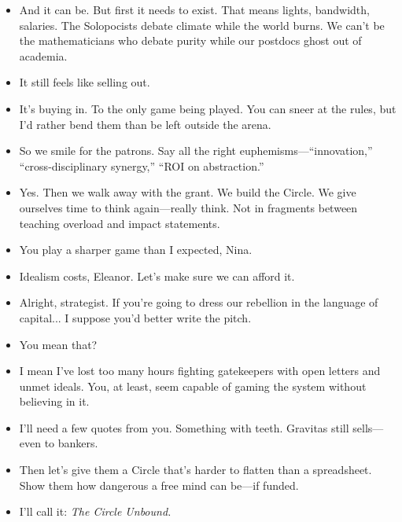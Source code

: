\begin{itemize}[leftmargin=1.3cm]
\item[Nina:] And it can be. But first it needs to exist. That means lights, bandwidth, salaries. The Solopocists debate climate while the world burns. We can’t be the mathematicians who debate purity while our postdocs ghost out of academia.

\item[Eleanor:] It still feels like selling out.

\item[Nina:] It’s buying in. To the only game being played. You can sneer at the rules, but I’d rather bend them than be left outside the arena.

\item[Eleanor:] So we smile for the patrons. Say all the right euphemisms—“innovation,” “cross-disciplinary synergy,” “ROI on abstraction.”

\item[Nina:] Yes. Then we walk away with the grant. We build the Circle. We give ourselves time to think again—really think. Not in fragments between teaching overload and impact statements.

\item[Eleanor:] You play a sharper game than I expected, Nina.

\item[Nina:] Idealism costs, Eleanor. Let's make sure we can afford it.

\item[Eleanor:] Alright, strategist. If you’re going to dress our rebellion in the language of capital... I suppose you’d better write the pitch.

\item[Nina:] You mean that?

\item[Eleanor:] I mean I’ve lost too many hours fighting gatekeepers with open letters and unmet ideals. You, at least, seem capable of gaming the system without believing in it.

\item[Nina:] I’ll need a few quotes from you. Something with teeth. Gravitas still sells—even to bankers.

\item[Eleanor:] Then let’s give them a Circle that’s harder to flatten than a spreadsheet. Show them how dangerous a free mind can be—if funded.

\item[Nina:] I’ll call it: \emph{The Circle Unbound.}

\end{itemize}

